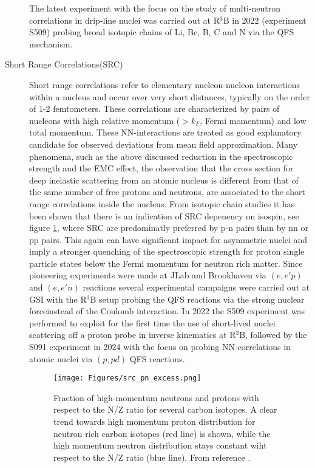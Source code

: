 \begin{description}
The latest experiment with the focus on the study of multi-neutron correlations in drip-line nuclei was carried out at R$^3$B in 2022 (experiment S509) probing broad isotopic chains of Li, Be, B, C and N via the QFS mechanism.
\item[Short Range Correlations(SRC)]Short range correlations refer to elementary nucleon-nucleon interactions within a nucleus and occur over very short distances, typically on the order of 1-2 femtometers.  These correlations are characterized by pairs of nucleons with high relative momentum ($> k_F$, Fermi momentum) and low total momentum. These NN-interactions are treated as good explanatory candidate for observed deviations from mean field approximation. Many phenomena, such as the above discussed reduction in the spectroscopic strength and the EMC effect\cite{xing2023electromagnetic}, the observation that  the cross section for deep inelastic scattering from an atomic nucleus is different from that of the same number of free protons and neutrons, are associated to the short range correlations inside the nucleus.\newline
From isotopic chain studies\cite{clas2018probing} it has been shown that there is an indication of SRC depenency on isospin, see figure \ref{fig:src_pairs}, where SRC are predominatly preferred by p-n pairs than by nn or pp pairs. This again can have significant impact for asymmetric nuclei and imply a stronger quenching of the spectroscopic strength for proton single particle states below the Fermi momentum for neutron rich matter.\newline  
Since pioneering experiments were made at JLab and Brookhaven via $(e,e'p)$ and $(e,e'n)$ reactions several  experimental campaigns were carried out at GSI with the R$^3$B setup probing the QFS reactions via the strong nuclear forceinstead of the Coulomb interaction. In 2022 the S509 experiment was performed to exploit for the first time the use of short-lived nuclei scattering off a proton probe in inverse kinematics at R$^3$B, followed by the S091 experiment in 2024 with the focus on probing NN-correlations in atomic nuclei via $(p,pd)$ QFS reactions\cite{paschalis2020nucleon}. 
\begin{figure}[htpb]
    \centering
    \texttt{[image: Figures/src\_pn\_excess.png]}
    \caption{
   	Fraction of high-momentum neutrons and protons with respect to the N/Z ratio for several carbon isotopes. A clear trend towards high momentum proton distribution for neutron rich carbon isotopes (red line) is shown, while the high momentum neutron distribution stays constant wiht respect to the N/Z ratio (blue line). From reference \cite{clas2018probing}. 
    }
    \label{fig:src_pairs}
\end{figure}


\end{description}
